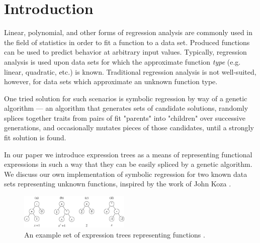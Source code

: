 
\section{Introduction}
\label{sec:intro}

Linear, polynomial, and other forms of regression analysis are commonly
used in the field of statistics in order to fit a function to a data set. Produced
functions can be used to predict behavior at arbitrary input values. Typically,
regression analysis is used upon data sets for which the approximate
function \textit{type} (e.g. linear, quadratic, etc.) is known. Traditional
regression analysis is not well-suited, however, for data sets which
approximate an unknown function type.

One tried solution for such scenarios is symbolic regression by way of
a genetic algorithm --- an algorithm that generates sets of candidate
solutions, randomly splices together traits from pairs of fit "parents"
into "children" over successive generations, and occasionally mutates
pieces of those candidates, until a strongly fit solution is found.

In our paper we introduce expression trees as a means of representing
functional expressions in such a way that they can be easily spliced by
a genetic algorithm. We discuss our own implementation of symbolic
regression for two known data sets representing unknown functions,
inspired by the work of John Koza \cite{koza}.

\begin{figure}[ht]
	\centering
	\includegraphics[width=0.47\textwidth]{figs/exprtrees.jpg}
	\caption{An example set of expression trees representing functions \cite{fig:gpquadraticexample}.}
	\label{fig:gpquadraticexample}
\end{figure}

